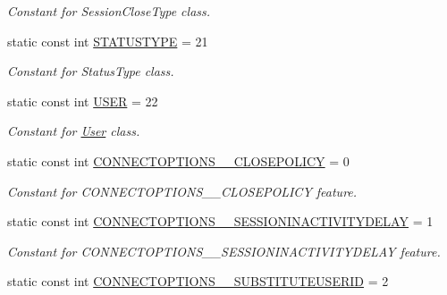 \begin{DoxyCompactItemize}
\begin{DoxyCompactList}\small\item\em Constant for SessionCloseType class. \item\end{DoxyCompactList}\item 
\hypertarget{classUMS__Data_1_1UMS__DataPackage_a10e223a94d2f042df21c196f8d7fbebd}{
static const int \hyperlink{classUMS__Data_1_1UMS__DataPackage_a10e223a94d2f042df21c196f8d7fbebd}{STATUSTYPE} = 21}
\label{classUMS__Data_1_1UMS__DataPackage_a10e223a94d2f042df21c196f8d7fbebd}

\begin{DoxyCompactList}\small\item\em Constant for StatusType class. \item\end{DoxyCompactList}\item 
\hypertarget{classUMS__Data_1_1UMS__DataPackage_a41d8c8a7d285aad019d25da3011867f3}{
static const int \hyperlink{classUMS__Data_1_1UMS__DataPackage_a41d8c8a7d285aad019d25da3011867f3}{USER} = 22}
\label{classUMS__Data_1_1UMS__DataPackage_a41d8c8a7d285aad019d25da3011867f3}

\begin{DoxyCompactList}\small\item\em Constant for \hyperlink{classUMS__Data_1_1User}{User} class. \item\end{DoxyCompactList}\item 
\hypertarget{classUMS__Data_1_1UMS__DataPackage_a63ba2d7a66fe399443d364bd2c99c09c}{
static const int \hyperlink{classUMS__Data_1_1UMS__DataPackage_a63ba2d7a66fe399443d364bd2c99c09c}{CONNECTOPTIONS\_\-\_\-CLOSEPOLICY} = 0}
\label{classUMS__Data_1_1UMS__DataPackage_a63ba2d7a66fe399443d364bd2c99c09c}

\begin{DoxyCompactList}\small\item\em Constant for CONNECTOPTIONS\_\-\_\-CLOSEPOLICY feature. \item\end{DoxyCompactList}\item 
\hypertarget{classUMS__Data_1_1UMS__DataPackage_ac3e27be80c79e4927a7bf2cebf378f99}{
static const int \hyperlink{classUMS__Data_1_1UMS__DataPackage_ac3e27be80c79e4927a7bf2cebf378f99}{CONNECTOPTIONS\_\-\_\-SESSIONINACTIVITYDELAY} = 1}
\label{classUMS__Data_1_1UMS__DataPackage_ac3e27be80c79e4927a7bf2cebf378f99}

\begin{DoxyCompactList}\small\item\em Constant for CONNECTOPTIONS\_\-\_\-SESSIONINACTIVITYDELAY feature. \item\end{DoxyCompactList}\item 
\hypertarget{classUMS__Data_1_1UMS__DataPackage_a6a74b65816c324e16d677bfcce5d2de9}{
static const int \hyperlink{classUMS__Data_1_1UMS__DataPackage_a6a74b65816c324e16d677bfcce5d2de9}{CONNECTOPTIONS\_\-\_\-SUBSTITUTEUSERID} = 2}
\label{classUMS__Data_1_1UMS__DataPackage_a6a74b65816c324e16d677bfcce5d2de9}


\end{DoxyCompactItemize}
